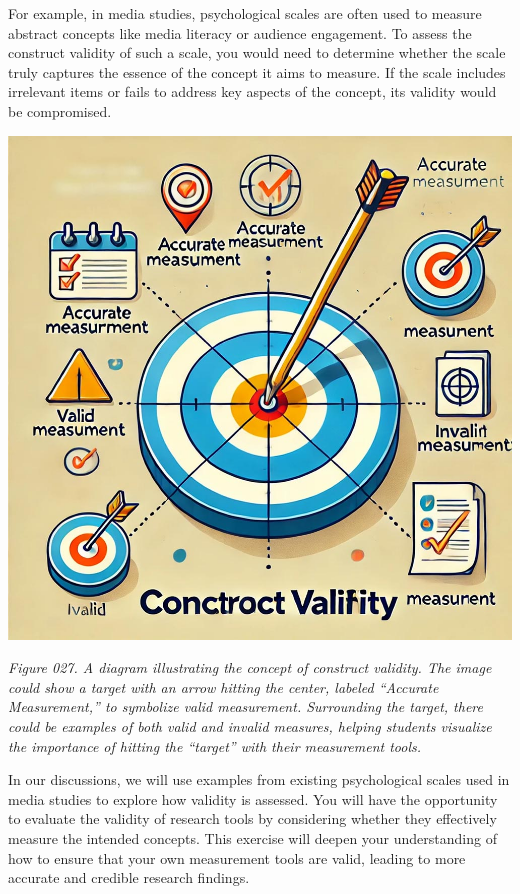 \documentclass[
]{book}
\begin{document}
For example, in media studies, psychological scales are often used to measure abstract concepts like media literacy or audience engagement. To assess the construct validity of such a scale, you would need to determine whether the scale truly captures the essence of the concept it aims to measure. If the scale includes irrelevant items or fails to address key aspects of the concept, its validity would be compromised.

\includegraphics[width=1\textwidth,height=\textheight]{images/fig027.jpg}

\emph{Figure 027. A diagram illustrating the concept of construct validity. The image could show a target with an arrow hitting the center, labeled ``Accurate Measurement,'' to symbolize valid measurement. Surrounding the target, there could be examples of both valid and invalid measures, helping students visualize the importance of hitting the ``target'' with their measurement tools.}

In our discussions, we will use examples from existing psychological scales used in media studies to explore how validity is assessed. You will have the opportunity to evaluate the validity of research tools by considering whether they effectively measure the intended concepts. This exercise will deepen your understanding of how to ensure that your own measurement tools are valid, leading to more accurate and credible research findings.
\end{document}
